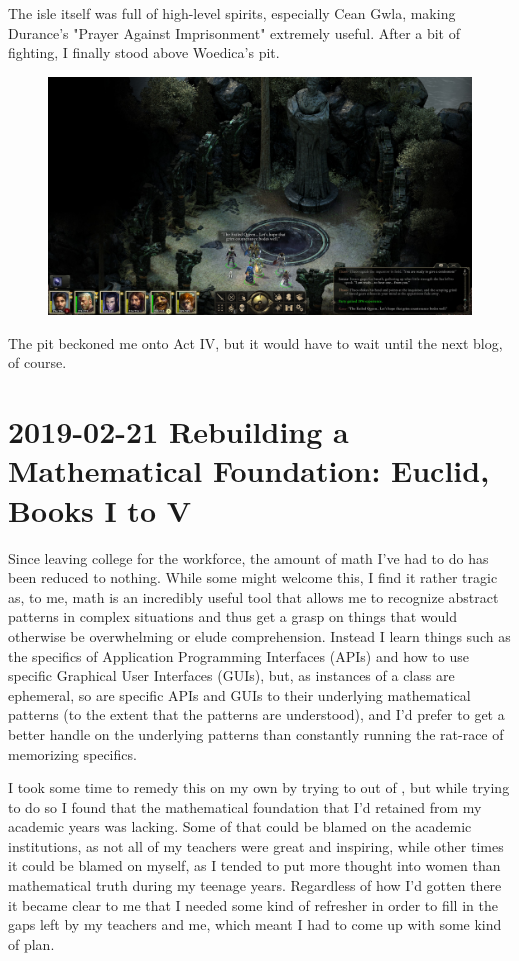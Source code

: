 \documentclass{article}
\begin{document}
The isle itself was full of high-level spirits, especially Cean Gwla, making Durance's "Prayer Against Imprisonment" extremely useful.  After a bit of fighting, I finally stood above Woedica's pit.

\begin{figure}
\includegraphics[scale=0.33]{files/blog/2019_03_04_pillars_of_eternity_path_of_the_damned_act_iii/2019_03_04_burialisle.jpg}
\end{figure}

The pit beckoned me onto Act IV, but it would have to wait until the next blog, of course.


\section{2019-02-21 Rebuilding a Mathematical Foundation: Euclid, Books I to V}
Since leaving college for the workforce, the amount of math I've had to do has been reduced to nothing.  While some might welcome this, I find it rather tragic as, to me, math is an incredibly useful tool that allows me to recognize abstract patterns in complex situations and thus get a grasp on things that would otherwise be overwhelming or elude comprehension.  Instead I learn things such as the specifics of Application Programming Interfaces (APIs) and how to use specific Graphical User Interfaces (GUIs), but, as instances of a class are ephemeral, so are specific APIs and GUIs to their underlying mathematical patterns (to the extent that the patterns are understood), and I'd prefer to get a better handle on the underlying patterns than constantly running the rat-race of memorizing specifics.

I took some time to remedy this on my own by trying to  out of , but while trying to do so I found that the mathematical foundation that I'd retained from my academic years was lacking.  Some of that could be blamed on the academic institutions, as not all of my teachers were great and inspiring, while other times it could be blamed on myself, as I tended to put more thought into women than mathematical truth during my teenage years.  Regardless of how I'd gotten there it became clear to me that I needed some kind of refresher in order to fill in the gaps left by my teachers and me, which meant I had to come up with some kind of plan.
\end{document}
